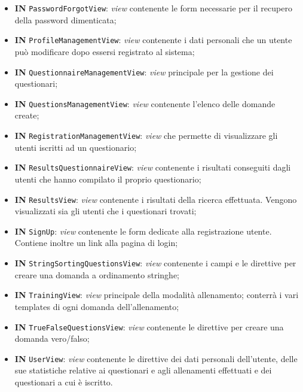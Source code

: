 \begin{itemize}
\begin{itemize}
			\item \textbf{IN} \texttt{PasswordForgotView}: \textit{view} contenente le form necessarie per il recupero della password dimenticata; 
			\item \textbf{IN} \texttt{ProfileManagementView}: \textit{view} contenente i dati personali che un utente può modificare dopo essersi registrato al sistema;
			\item \textbf{IN} \texttt{QuestionnaireManagementView}:  \textit{view} principale per la gestione dei questionari;
			\item \textbf{IN} \texttt{QuestionsManagementView}: \textit{view} contenente l'elenco delle domande create; 
			\item \textbf{IN} \texttt{RegistrationManagementView}: \textit{view} che permette di visualizzare gli utenti iscritti ad un questionario;
			\item \textbf{IN} \texttt{ResultsQuestionnaireView}: \textit{view} contenente i risultati conseguiti dagli utenti che hanno compilato il proprio questionario;
			\item \textbf{IN} \texttt{ResultsView}: \textit{view} contenente i risultati della ricerca effettuata. Vengono visualizzati sia gli utenti che i questionari trovati;
			\item \textbf{IN} \texttt{SignUp}:  \textit{view} contenente le form dedicate alla registrazione utente. Contiene inoltre un link alla pagina di login;
			\item \textbf{IN} \texttt{StringSortingQuestionsView}:  \textit{view} contenente i campi e le direttive per creare una domanda a ordinamento stringhe; 
			\item \textbf{IN} \texttt{TrainingView}: \textit{view} principale della modalità allenamento; conterrà i vari templates di ogni domanda dell'allenamento;
			\item \textbf{IN} \texttt{TrueFalseQuestionsView}: \textit{view} contenente le direttive per creare una domanda vero/falso;
			\item \textbf{IN} \texttt{UserView}:  \textit{view} contenente le direttive dei dati personali dell'utente, delle sue statistiche relative ai questionari e agli allenamenti effettuati e dei questionari a cui è iscritto.
		\end{itemize}
	\end{itemize}
